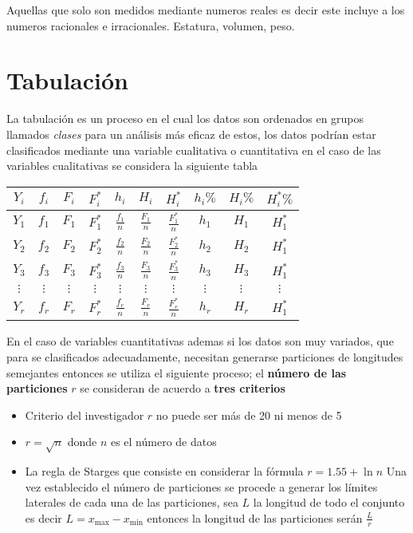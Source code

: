 \documentclass[10pt,]{krantz}
\providecommand{\tightlist}{%
  \setlength{\itemsep}{0pt}\setlength{\parskip}{0pt}}
\theoremstyle{definition}
\theoremstyle{definition}
\theoremstyle{definition}
\theoremstyle{remark}
\begin{document}
Aquellas que solo son medidos mediante numeros reales es decir este incluye a los numeros racionales e irracionales. Estatura, volumen, peso.

\hypertarget{tabulaciuxf3n}{%
\chapter{Tabulación}\label{tabulaciuxf3n}}

La tabulación es un proceso en el cual los datos son ordenados en grupos llamados \emph{clases} para un análisis más eficaz de estos, los datos podrían estar clasificados mediante una variable cualitativa o cuantitativa en el caso de las variables cualitativas se considera la siguiente tabla

\begin{longtable}[]{@{}cccccccccc@{}}
\toprule
\(Y_i\) & \(f_i\) & \(F_i\) & \(F_i^*\) & \(h_i\) & \(H_i\) & \(H_i^*\) & \(h_i\%\) & \(H_i\%\) & \(H_i^*\%\)\tabularnewline
\midrule
\endhead
\(Y_1\) & \(f_1\) & \(F_1\) & \(F_1^*\) & \(\frac{f_1}{n}\) & \(\frac{F_1}{n}\) & \(\frac{F_1^*}{n}\) & \(h_1\) & \(H_1\) & \(H_1^*\)\tabularnewline
\(Y_2\) & \(f_2\) & \(F_2\) & \(F_2^*\) & \(\frac{f_2}{n}\) & \(\frac{F_2}{n}\) & \(\frac{F_2^*}{n}\) & \(h_2\) & \(H_2\) & \(H_1^*\)\tabularnewline
\(Y_3\) & \(f_3\) & \(F_3\) & \(F_3^*\) & \(\frac{f_3}{n}\) & \(\frac{F_3}{n}\) & \(\frac{F_3^*}{n}\) & \(h_3\) & \(H_3\) & \(H_1^*\)\tabularnewline
\(\vdots\) & \(\vdots\) & \(\vdots\) & \(\vdots\) & \(\vdots\) & \(\vdots\) & \(\vdots\) & \(\vdots\) & \(\vdots\) & \(\vdots\)\tabularnewline
\(Y_r\) & \(f_r\) & \(F_r\) & \(F_r^*\) & \(\frac{f_r}{n}\) & \(\frac{F_r}{n}\) & \(\frac{F_r^*}{n}\) & \(h_r\) & \(H_r\) & \(H_1^*\)\tabularnewline
\bottomrule
\end{longtable}

En el caso de variables cuantitativas ademas si los datos son muy variados, que para se clasificados adecuadamente, necesitan generarse particiones de longitudes semejantes entonces se utiliza el siguiente proceso; el \textbf{número de las particiones} \(r\) se consideran de acuerdo a \textbf{tres criterios}

\begin{itemize}
\tightlist
\item
  Criterio del investigador \(r\) no puede ser más de 20 ni menos de 5
\item
  \(r=\sqrt{n}\) donde \(n\) es el número de datos
\item
  La regla de Starges que consiste en considerar la fórmula \(r=1.55+\ln n\)
  Una vez establecido el número de particiones se procede a generar los límites laterales de cada una de las particiones, sea \(L\) la longitud de todo el conjunto es decir \(L=x_{\text{max}}-x_{\text{min}}\) entonces la longitud de las particiones serán \(\frac{L}{r}\)
\end{itemize}
\end{document}
